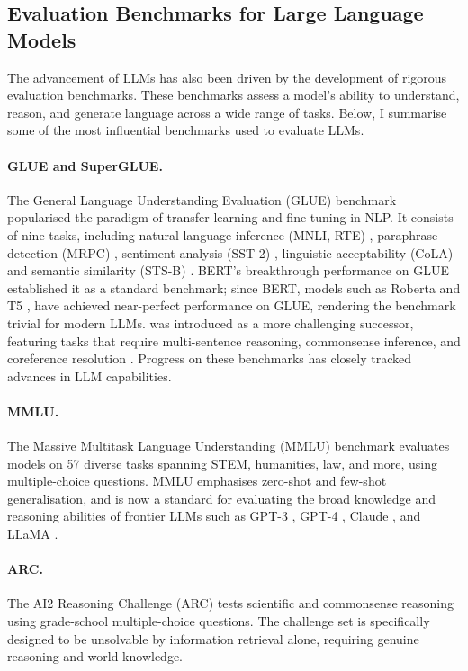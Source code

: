 \subsection{Evaluation Benchmarks for Large Language Models}
The advancement of LLMs has also been driven by the development of rigorous evaluation benchmarks. These benchmarks assess a model's ability to understand, reason, and generate language across a wide range of tasks. Below, I summarise some of the most influential benchmarks used to evaluate LLMs.
\paragraph{GLUE and SuperGLUE.} The General Language Understanding Evaluation (GLUE) benchmark \citep{wang2018glue} popularised the paradigm of transfer learning and fine-tuning in NLP. It consists of nine tasks, including natural language inference (MNLI, RTE) \citep{williams2018mnli,dagan2006rte}, paraphrase detection (MRPC) \citep{dolan2005mrpc}, sentiment analysis (SST-2) \citep{socher2013sst}, linguistic acceptability (CoLA) \citep{warstadt2019cola} and semantic similarity (STS-B) \citep{cer2017stsb}. BERT's breakthrough performance on GLUE established it as a standard benchmark; since BERT, models such as Roberta \citep{liu2019roberta} and T5 \citep{raffel2020t5}, have achieved near-perfect performance on GLUE, rendering the benchmark trivial for modern LLMs.  \citep{wang2019superglue} was introduced as a more challenging successor, featuring tasks that require multi-sentence reasoning, commonsense inference, and coreference resolution \citep{zhang2018record,pilehvar2019wic,khashabi2018multirc,roemmele2011copa}. Progress on these benchmarks has closely tracked advances in LLM capabilities.

\paragraph{MMLU.} The Massive Multitask Language Understanding (MMLU) \citep{hendrycks2021mmlu} benchmark evaluates models on 57 diverse tasks spanning STEM, humanities, law, and more, using multiple-choice questions. MMLU emphasises zero-shot and few-shot generalisation, and is now a standard for evaluating the broad knowledge and reasoning abilities of frontier LLMs such as GPT-3 \citep{brown2020gpt3}, GPT-4 \citep{openai2023gpt4}, Claude \citep{anthropic2024claude3}, and LLaMA \citep{touvron2023llama}.

\paragraph{ARC.} The AI2 Reasoning Challenge (ARC) \citep{clark2018arc} tests scientific and commonsense reasoning using grade-school multiple-choice questions. The challenge set is specifically designed to be unsolvable by information retrieval alone, requiring genuine reasoning and world knowledge.

